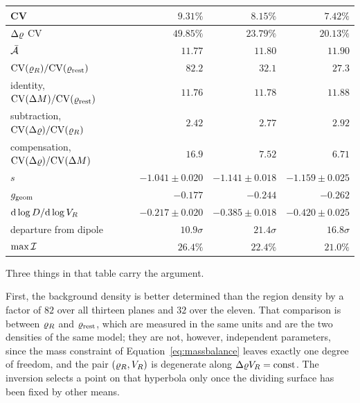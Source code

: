\begin{table}[htbp]
\begin{tabular}{lrrr}
\quad CV                          & $9.31\%$  & $8.15\%$  & $7.42\%$ \\
\midrule
$\Delta\varrho$ CV                       & $49.85\%$ & $23.79\%$ & $20.13\%$ \\
\midrule
$\bar{\mathcal{A}}$                   & $11.77$  & $11.80$  & $11.90$ \\
$\mathrm{CV}(\varrho_{R})/\mathrm{CV}(\varrho_{\mathrm{rest}})$      & $82.2$   & $32.1$   & $27.3$ \\
\quad identity, $\mathrm{CV}(\Delta M)/\mathrm{CV}(\varrho_{\mathrm{rest}})$ & $11.76$ & $11.78$ & $11.88$ \\
\quad subtraction, $\mathrm{CV}(\Delta\varrho)/\mathrm{CV}(\varrho_{R})$ & $2.42$ & $2.77$ & $2.92$ \\
\quad compensation, $\mathrm{CV}(\Delta\varrho)/\mathrm{CV}(\Delta M)$ & $16.9$ & $\mathbf{7.52}$ & $6.71$ \\
\midrule
$s$                               & $-1.041\pm0.020$ & $\mathbf{-1.141\pm0.018}$ & $-1.159\pm0.025$ \\
$g_{\mathrm{geom}}$                      & $-0.177$ & $-0.244$ & $-0.262$ \\
$\mathrm{d}\log D/\mathrm{d}\log V_{R}$
                                  & $-0.217\pm0.020$ & $-0.385\pm0.018$ & $-0.420\pm0.025$ \\
\quad departure from dipole       & $10.9\sigma$ & $21.4\sigma$ & $16.8\sigma$ \\
\midrule
$\max \mathcal{I}$                   & $26.4\%$ & $22.4\%$ & $21.0\%$ \\
\bottomrule
\end{tabular}
\end{table}

Three things in that table carry the argument.

First, the background density is better determined than the region density
by a factor of $82$ over all thirteen planes and $32$ over the eleven. That
comparison is between $\varrho_{R}$ and $\varrho_{\mathrm{rest}}$, which are measured in the
same units and are the two densities of the same model; they are not,
however, independent parameters, since the mass constraint of
Equation~\eqref{eq:massbalance} leaves exactly one degree of freedom, and
the pair $(\varrho_{R},V_{R})$ is degenerate along $\Delta\varrho V_{R} = \mathrm{const}$.
The inversion selects a point on that hyperbola only once the dividing
surface has been fixed by other means.

